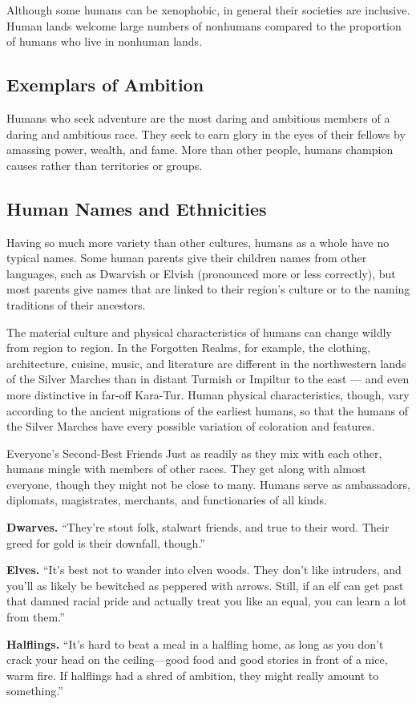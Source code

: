 Although some humans can be xenophobic, in general their societies are inclusive. Human lands welcome large numbers of nonhumans compared to the proportion of humans who live in nonhuman lands.

\subsection{Exemplars of Ambition}
Humans who seek adventure are the most daring and ambitious members of a daring and ambitious race. They seek to earn glory in the eyes of their fellows by amassing power, wealth, and fame. More than other people, humans champion causes rather than territories or groups.

\subsection{Human Names and Ethnicities}
Having so much more variety than other cultures, humans as a whole have no typical names. Some human parents give their children names from other languages, such as Dwarvish or Elvish (pronounced more or less correctly), but most parents give names that are linked to their region’s culture or to the naming traditions of their ancestors.

The material culture and physical characteristics of humans can change wildly from region to region. In the Forgotten Realms, for example, the clothing, architecture, cuisine, music, and literature are different in the northwestern lands of the Silver Marches than in distant Turmish or Impiltur to the east — and even more distinctive in far-off Kara-Tur. Human physical characteristics, though, vary according to the ancient migrations of the earliest humans, so that the humans of the Silver Marches have every possible variation of coloration
and features.

\begin{DndSidebar}[float=!b]{Everyone’s Second-Best Friends}
Just as readily as they mix with each other, humans mingle with members of other races. They get along with almost everyone, though they might not be close to many. Humans serve as ambassadors, diplomats, magistrates, merchants, and functionaries of all kinds.

\textbf{Dwarves.} ``They’re stout folk, stalwart friends, and true to their word. Their greed for gold is their downfall, though.''

\textbf{Elves.} ``It’s best not to wander into elven woods. They don’t like intruders, and you’ll as likely be bewitched as peppered with arrows. Still, if an elf can get past that damned racial pride and actually treat you like an equal, you can learn a lot from them.''

\textbf{Halflings.} ``It’s hard to beat a meal in a halfling home, as long as you don’t crack your head on the ceiling—good food and good stories in front of a nice, warm fire. If halflings had a shred of ambition, they might really amount to something.''
\end{DndSidebar}

